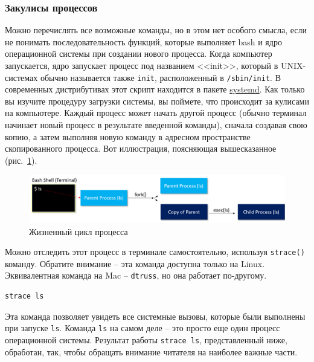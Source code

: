 \documentclass[12pt]{article}
\begin{document}
\hypertarget{Processes-Behind-the-Scenes}{%
\subsubsection{\texorpdfstring{\protect\hyperlink{Processes-Behind-the-Scenes}{}Закулисы
процессов}{Закулисы процессов}}\label{Processes-Behind-the-Scenes}}

Можно перечислять все возможные команды, но в этом нет особого смысла,
если не понимать последовательность функций, которые выполняет bash и
ядро операционной системы при создании нового процесса. Когда компьютер
запускается, ядро запускает процесс под названием <<init>>, который в
UNIX-системах обычно называется также \texttt{init}, расположенный в
\texttt{/sbin/init}. В современных дистрибутивах этот скрипт находится в
пакете \href{https://en.wikipedia.org/wiki/Systemd}{systemd}. Как только
вы изучите процедуру загрузки системы, вы поймете, что происходит за
кулисами на компьютере. Каждый процесс может начать другой процесс
(обычно терминал начинает новый процесс в результате введенной команды),
сначала создавая свою копию, а затем выполняя новую команду в адресном
пространстве скопированного процесса. Вот иллюстрация, поясняющая
вышесказанное (рис.~\ref{fig:proclc}).

\begin{figure}[tbh]
  \centering

  \includegraphics[width=\linewidth]{blog/2019/bash-essentials/processes-linux.png}
  \caption{Жизненный цикл процесса}
  \label{fig:proclc}
\end{figure}
Можно отследить этот процесс в терминале самостоятельно, используя
\texttt{strace()} команду. Обратите внимание -- эта команда доступна
только на Linux. Эквивалентная команда на Mac -- \texttt{dtruss}, но она
работает по-другому.

\begin{verbatim}
strace ls
\end{verbatim}

Эта команда позволяет увидеть все системные вызовы, которые были
выполнены при запуске \texttt{ls}. Команда \texttt{ls} на самом деле --
это просто еще один процесс операционной системы. Результат работы
\texttt{strace\ ls}, представленный ниже, обработан, так, чтобы обращать
внимание читателя на наиболее важные части.
\end{document}
